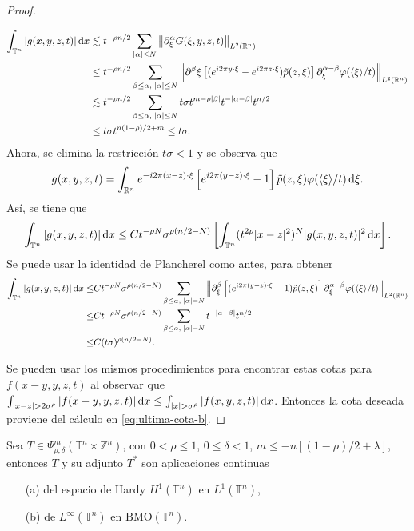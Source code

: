\begin{proof}
\begin{itemize}
		\begin{align*}
			\int_{\mathbb{T}^n}|g(x, y, z, t)|\mathop{}\!\mathrm{d} x  &\lesssim t^{-\rho n/2} \sum_{|\alpha|\leq N} \left\| \partial^\alpha_\xi G(\xi, y, z ,t) \right\|_{L^2(\mathbb{R}^n)}\\ 
			 & \leq t^{-\rho n/2} \sum_{\beta\leq\alpha,\;|\alpha|\leq N} \left\| \partial^\beta\xi \left[ (e^{i2\pi y \cdot \xi} -e^{i2\pi z \cdot \xi})  \tilde{p}(z, \xi)\right]  \partial^{\alpha-\beta}_\xi\varphi(\langle\xi\rangle/t)  \right\|_{L^2(\mathbb{R}^n)} \\
			 & \lesssim t^{-\rho n/2} \sum_{\beta\leq\alpha,\;|\alpha|\leq N} t\sigma t^{m-\rho|\beta|}t^{-|\alpha-\beta|}t^{n/2} \\
			& \leq t\sigma t^{n(1-\rho)/2 + m} \leq t\sigma.
		\end{align*}
		Ahora, se elimina la restricción $t\sigma<1$ y se observa que
		\begin{equation*}
			g(x, y, z, t) = \int_{\mathbb{R}^n} e^{-i2\pi (x-z) \cdot \xi} \left[ e^{i2\pi (y-z) \cdot \xi} -1 \right]\tilde{p}(z, \xi)\varphi(\langle\xi\rangle/t) \mathop{}\!\mathrm{d} \xi.
		\end{equation*}
		Así, se tiene que
		\begin{equation*}
			\int_{\mathbb{T}^n} |g(x, y, z, t)|\mathop{}\!\mathrm{d} x \leq Ct^{-\rho N}\sigma^{\rho(n/2 - N)} \left[ \int_{\mathbb{T}^n} (t^{2\rho}|x-z|^2)^N|g(x, y, z, t)|^2\mathop{}\!\mathrm{d} x \right].
		\end{equation*}
		Se puede usar la identidad de Plancherel como antes, para obtener
		\begin{align*}
			\int_{\mathbb{T}^n} |g(x, y, z, t)|\mathop{}\!\mathrm{d} x \leq & Ct^{-\rho N}\sigma^{\rho(n/2 - N)} \sum_{\beta\leq\alpha,\;|\alpha|=N} \left\| \partial^\beta_\xi \left[ (e^{i2\pi (y-z) \cdot \xi} -1)\tilde{p}(z, \xi) \right] \partial^{\alpha-\beta}_\xi\varphi(\langle\xi\rangle/t) \right\|_{L^2(\mathbb{R}^n)} \\
			\leq& Ct^{-\rho N}\sigma^{\rho(n/2 - N)} \sum_{\beta\leq\alpha,\;|\alpha|=N}t^{-|\alpha-\beta|}t^{n/2} \\
			\leq & C(t\sigma)^{\rho(n/2-N)}.
		\end{align*}
	\end{itemize}
	Se pueden usar los mismos procedimientos para encontrar estas cotas para $f(x-y, y,z, t)$ al observar que $\int_{|x-z|>2\sigma^\rho} |f(x-y, y,z, t)|\diff x \leq \int_{|x|>\sigma^\rho} |f(x, y,z, t)|\diff x$. Entonces la cota deseada proviene del cálculo en \cref{eq:ultima-cota-b}.
\end{proof}
\begin{theorem}
	Sea $T \in \Psi^m_{\rho, \delta}(\mathbb{T}^n \times \mathbb{Z}^n) $, con $0 < \rho \leq 1$, $0 \leq \delta < 1$, $m \leq - n [(1-\rho)/2 + \lambda] $, entonces $T$ y su adjunto $T^*$ son aplicaciones continuas
	\begin{itemize}
		\item[(a)] del espacio de Hardy $H^1(\mathbb{T}^n)$ en $L^1(\mathbb{T}^n)$,
		\item[(b)] de $L^\infty(\mathbb{T}^n)$ en $\text{BMO}(\mathbb{T}^n)$.
	\end{itemize}
\end{theorem}
